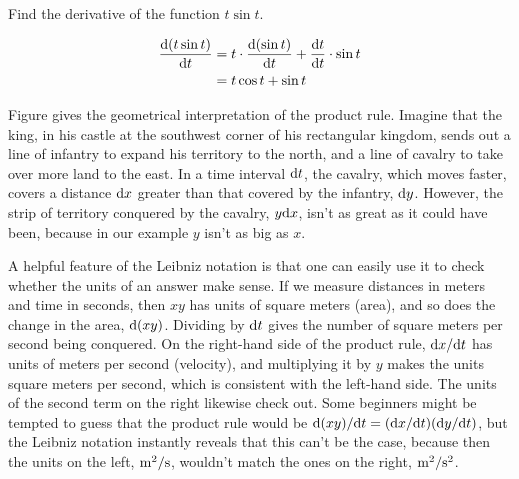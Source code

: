 \begin{eg}
\egquestion Find the derivative of the function $t\sin t$.

\eganswer
\begin{align*}
  \frac{\textup{d}(t\sin t)}{\textup{d} t} &= t\cdot \frac{\textup{d}(\sin t)}{\textup{d} t}+\frac{\textup{d} t}{\textup{d} t}\cdot\sin t \\
           &= t\cos t+\sin t
\end{align*}
\end{eg}

Figure  gives the geometrical interpretation of the product rule. Imagine that the king, in his castle
at the southwest corner of his rectangular kingdom, sends out a line of infantry to expand his territory
to the north, and a line of cavalry to take over more land to the east. In a time interval $\textup{d} t$,
the cavalry, which moves faster, covers a distance $\textup{d} x$ greater than that covered by the infantry,
$\textup{d} y$. However, the strip of territory conquered by the cavalry, $y \textup{d} x$, isn't as great as it could have been,
because in our example $y$ isn't as big as $x$.
%

A helpful feature of the Leibniz notation is that one can easily use it to check whether the units of an
answer make sense. If we measure distances in meters and time in seconds, then $xy$ has units of
square meters (area), and so does the change in the area, $\textup{d}(xy)$. Dividing by $\textup{d} t$ gives the
number of square meters per second being conquered. On the right-hand side of the product rule,
$\textup{d} x/\textup{d} t$ has units of meters per second (velocity), and multiplying it by
$y$ makes the units square meters per second, which is consistent with the left-hand side. The
units of the second term on the right likewise check out. Some beginners might be tempted to
guess that the product rule would be $\textup{d}(xy)/\textup{d} t=(\textup{d} x/\textup{d} t)(\textup{d} y/\textup{d} t)$, but the Leibniz
notation instantly reveals that this can't be the case, because then the units on the left,
$\textup{m}^2/\textup{s}$, wouldn't match the ones on the right, $\textup{m}^2/\textup{s}^2$.

